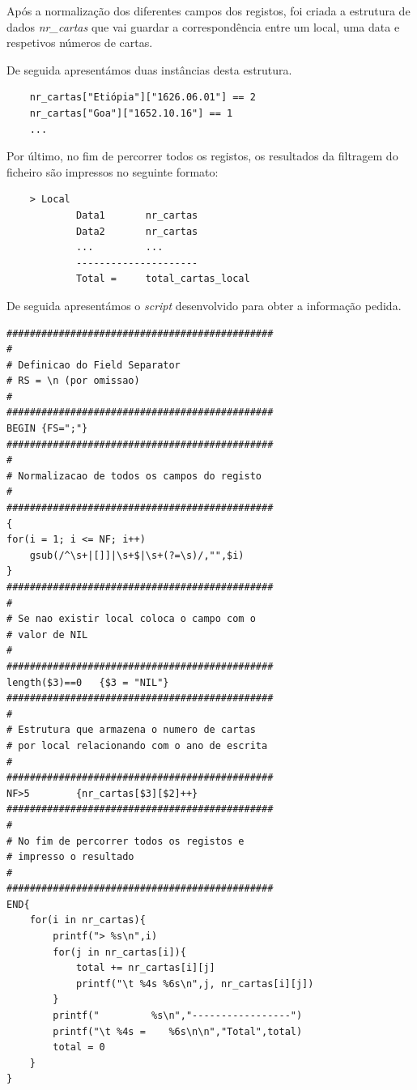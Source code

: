 \documentclass[11pt,a4paper]{report}
\begin{document}
\quad Após a normalização dos diferentes campos dos registos, foi criada a estrutura de dados \textit{nr\_cartas} que vai guardar a correspondência entre um local, uma data e respetivos números de cartas. 

\quad De seguida apresentámos duas instâncias desta estrutura.
\small{
\begin{verbatim}
    nr_cartas["Etiópia"]["1626.06.01"] == 2
    nr_cartas["Goa"]["1652.10.16"] == 1
    ...
\end{verbatim}

\quad Por último, no fim de percorrer todos os registos, os resultados da filtragem do ficheiro são impressos no seguinte formato:

\begin{verbatim}
    > Local
            Data1       nr_cartas
            Data2       nr_cartas
            ...         ...
            ---------------------
            Total =     total_cartas_local
\end{verbatim}

De seguida apresentámos o \textit{script} desenvolvido para obter a informação pedida.

\newpage

\begin{verbatim}
##############################################
#
# Definicao do Field Separator
# RS = \n (por omissao)
#
##############################################
BEGIN {FS=";"}
##############################################
#
# Normalizacao de todos os campos do registo
#
##############################################
{ 
for(i = 1; i <= NF; i++) 
    gsub(/^\s+|[]]|\s+$|\s+(?=\s)/,"",$i)
}
##############################################
#
# Se nao existir local coloca o campo com o
# valor de NIL
#
##############################################
length($3)==0	{$3 = "NIL"}
##############################################
#
# Estrutura que armazena o numero de cartas 
# por local relacionando com o ano de escrita
#
##############################################
NF>5		{nr_cartas[$3][$2]++}
##############################################
#
# No fim de percorrer todos os registos e
# impresso o resultado
#
##############################################
END{
    for(i in nr_cartas){
        printf("> %s\n",i)
        for(j in nr_cartas[i]){
            total += nr_cartas[i][j]
            printf("\t %4s %6s\n",j, nr_cartas[i][j])
        }
	    printf("         %s\n","-----------------")
	    printf("\t %4s =    %6s\n\n","Total",total)
	    total = 0
    }
}
\end{verbatim}}
\end{document}
